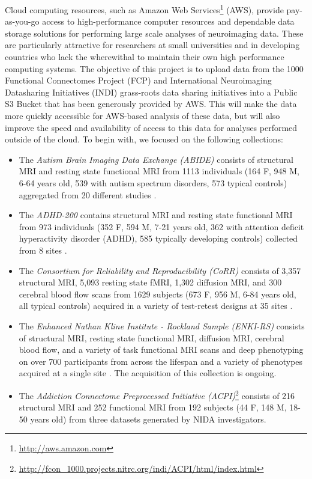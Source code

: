 \documentclass[twocolumn]{bmcart}%
\begin{document}
Cloud computing resources, such as Amazon Web
Services\footnote{\url{http://aws.amazon.com}} (AWS), provide
pay-as-you-go access to high-performance computer resources and
dependable data storage solutions for performing large scale analyses of
neuroimaging data\cite{Clark2015}. These are particularly attractive for
researchers at small universities and in developing countries who lack
the wherewithal to maintain their own high performance computing
systems. The objective of this project is to upload data from the 1000
Functional Connectomes Project (FCP)\cite{biswal2010} and International
Neuroimaging Datasharing Initiatives (INDI) \cite{mennes2013}
grass-roots data sharing initiatives into a Public S3 Bucket that has
been generously provided by AWS. This will make the data more quickly
accessible for AWS-based analysis of these data, but will also improve
the speed and availability of access to this data for analyses performed
outside of the cloud. To begin with, we focused on the following
collections:

\begin{itemize}
\itemsep1pt\parskip0pt
\item
  The \emph{Autism Brain Imaging Data Exchange (ABIDE)} consists of
  structural MRI and resting state functional MRI from 1113 individuals
  (164 F, 948 M, 6-64 years old, 539 with autism spectrum disorders, 573
  typical controls) aggregated from 20 different studies
  \cite{dimartino2014}.
\item
  The \emph{ADHD-200} contains structural MRI and resting state
  functional MRI from 973 individuals (352 F, 594 M, 7-21 years old, 362
  with attention deficit hyperactivity disorder (ADHD), 585 typically
  developing controls) collected from 8 sites \cite{Milham2012}.
\item
  The \emph{Consortium for Reliability and Reproducibility (CoRR)}
  consists of 3,357 structural MRI, 5,093 resting state fMRI, 1,302
  diffusion MRI, and 300 cerebral blood flow scans from 1629 subjects
  (673 F, 956 M, 6-84 years old, all typical controls) acquired in a
  variety of test-retest designs at 35 sites \cite{zuo2014}.
\item
  The \emph{Enhanced Nathan Kline Institute - Rockland Sample (ENKI-RS)}
  consists of structural MRI, resting state functional MRI, diffusion
  MRI, cerebral blood flow, and a variety of task functional MRI scans
  and deep phenotyping on over 700 participants from across the lifespan
  and a variety of phenotypes acquired at a single site
  \cite{nooner2012}. The acquisition of this collection is ongoing.
\item
  The \emph{Addiction Connectome Preprocessed Initiative
  (ACPI)}\footnote{\url{http://fcon_1000.projects.nitrc.org/indi/ACPI/html/index.html}}
  consists of 216 structural MRI and 252 functional MRI from 192
  subjects (44 F, 148 M, 18-50 years old) from three datasets generated
  by NIDA investigators.
\end{itemize}
\end{document}
